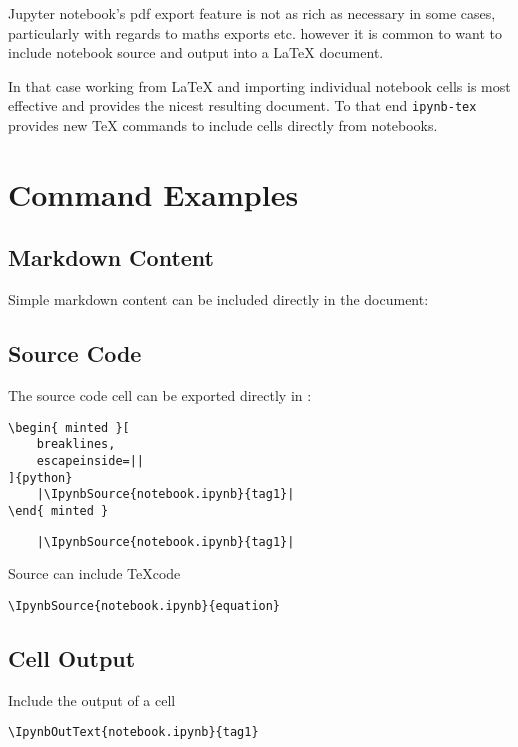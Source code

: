 \documentclass[11pt]{article}
\begin{document}
\noindent Jupyter notebook's pdf export feature is not as rich as necessary in some cases, particularly with regards to maths exports etc. however it is common to want to include notebook source and output into a LaTeX document.

In that case working from LaTeX and importing individual notebook cells is most effective and provides the nicest resulting document. To that end \verb|ipynb-tex| provides new TeX commands to include cells directly from notebooks.

\section{Command Examples}

\subsection{Markdown Content}
Simple markdown content can be included directly in the document:
\begin{center}
    \texttt{}\vspace{1em}
\end{center}

\subsection{Source Code}
The source code cell can be exported directly in :
\begin{verbatim}
\begin{ minted }[
    breaklines, 
    escapeinside=||
]{python}
    |\IpynbSource{notebook.ipynb}{tag1}|
\end{ minted }
\end{verbatim}
\begin{verbatim}
    |\IpynbSource{notebook.ipynb}{tag1}|
\end{verbatim}
Source can include \TeX code
\begin{Verbatim}
\IpynbSource{notebook.ipynb}{equation}
\end{Verbatim}

\subsection*{Cell Output}
Include the output of a cell
\begin{Verbatim}
\IpynbOutText{notebook.ipynb}{tag1}
\end{Verbatim}
\end{document}
